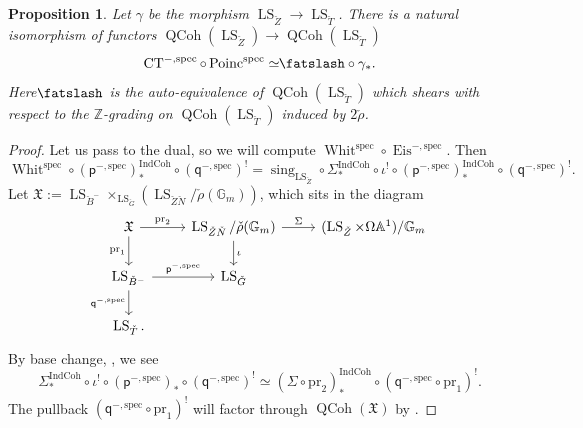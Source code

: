 \documentclass[11pt]{amsart}
\newcommand{\shear}{{\mathbin{\mkern-6mu\fatslash}}}
\newcommand{\bG}{\mathbb{G}}
\newcommand{\bA}{\mathbb{A}}
\newcommand{\Z}{{\mathbb Z}}
\newcommand{\spec}{\mathrm{spec}}
\newcommand{\Whit}{\operatorname{Whit}}
\newcommand{\Eis}{\operatorname{Eis}}
\newcommand{\CT}{\operatorname{CT}}
\newcommand{\Poinc}{\operatorname{Poinc}}
\newcommand{\pp}{{\mathsf{p}}}
\newcommand{\qq}{{\mathsf{q}}}
\newcommand{\sing}{\operatorname{sing}}
\DeclareMathOperator{\QCoh}{QCoh}
\DeclareMathOperator{\IndCoh}{IndCoh}
\DeclareMathOperator{\LS}{LS}
\newtheorem{prop}[thm]{Proposition}
\theoremstyle{remark}
\theoremstyle{definition}
\begin{document}
\begin{prop}\label{prop:spectral-image}   
Let $\gamma$ be the morphism $\LS_{\check Z}\to\LS_{\check T}$. There is a natural isomorphism of functors $\QCoh(\LS_{\check Z})\to\QCoh(\LS_{\check T})$
\[\CT^{-,\spec}\circ\Poinc^\spec\simeq\shear\circ\gamma_*.\]
Here $\shear$ is the auto-equivalence of $\QCoh(\LS_{\check T})$ which shears with respect to the $\Z$-grading on $\QCoh(\LS_{\check T})$ induced by $2\check\rho$.
\end{prop}
\begin{proof}
    Let us pass to the dual, so we will compute $\Whit^{\spec}\circ\Eis^{-,\spec}$. Then
    \[
    \Whit^\spec\circ(\pp^{-,\spec})_*^{\IndCoh}\circ(\qq^{-,\spec})^!=\sing_{\LS_{\check Z}}\circ\Sigma_*^{\IndCoh}\circ\iota^!\circ(\pp^{-,\spec})_*^{\IndCoh}\circ(\qq^{-,\spec})^!.
    \]
Let $\mathfrak X:=\LS_{\check B^-}\times_{\LS_{\check G}}(\LS_{\check Z\check N}/\check\rho(\bG_m))$, which sits in the diagram 
\[
\begin{tikzcd}
    \mathfrak X\arrow{r}{\mathrm{pr}_2}\arrow[swap]{d}{\mathrm{pr}_1}&\LS_{\check Z\check N}/\check\rho(\bG_m)\arrow{r}{\Sigma}\arrow{d}{\iota}&(\LS_{\check Z}\times\Omega\bA^1)/\bG_m\\
    \LS_{\check B^-}\arrow{r}{\pp^{-,\spec}}\arrow[swap]{d}{\qq^{-,\spec}}&\LS_{\check G}\\
    \LS_{\check T}.
\end{tikzcd}
\]
By base change, \cite[\S5.2.5]{indcoh}, we see
\[
\Sigma_*^{\IndCoh}\circ\iota^!\circ(\pp^{-,\spec})_*\circ(\qq^{-,\spec})^!\simeq(\Sigma\circ\mathrm{pr}_2)^{\IndCoh}_*\circ(\qq^{-,\spec}\circ\mathrm{pr}_1)^!.
\]
The pullback $(\qq^{-,\spec}\circ\mathrm{pr}_1)^!$ will factor through $\QCoh(\mathfrak X)$ by \cite[Theorem~1.3.11]{singular-support}.


\end{proof}
\end{document}
